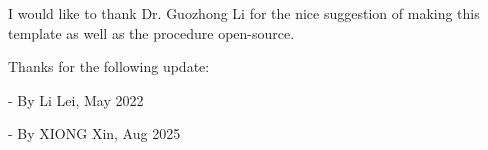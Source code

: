 I would like to thank Dr. Guozhong Li for the nice suggestion of making this template as well as the procedure open-source.

Thanks for the following update:

- By Li Lei, May 2022

- By XIONG Xin, Aug 2025
